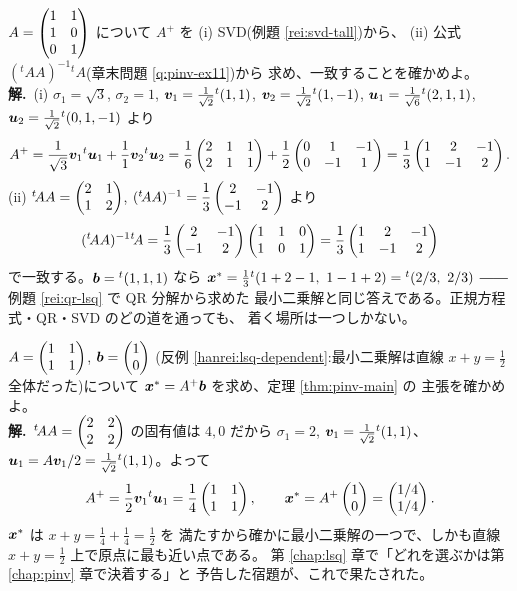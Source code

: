 \begin{rei}\label{rei:pinv-fullcol}
$A = \begin{pmatrix}1 & 1 \\ 1 & 0 \\ 0 & 1\end{pmatrix}$ について $A^{+}$ を
(i) SVD(例題 \ref{rei:svd-tall})から、
(ii) 公式 $({}^t\!AA)^{-1}{}^t\!A$(章末問題 \ref{q:pinv-ex11})から
求め、一致することを確かめよ。\\
\textbf{解.}\ (i) $\sigma_1 = \sqrt{3}$, $\sigma_2 = 1$,
$\bm{v}_1 = \frac{1}{\sqrt{2}}{}^t(1,1)$,
$\bm{v}_2 = \frac{1}{\sqrt{2}}{}^t(1,-1)$,
$\bm{u}_1 = \frac{1}{\sqrt{6}}{}^t(2,1,1)$,
$\bm{u}_2 = \frac{1}{\sqrt{2}}{}^t(0,1,-1)$ より
\[
A^{+} = \frac{1}{\sqrt{3}}\bm{v}_1{}^t\bm{u}_1
+ \frac{1}{1}\bm{v}_2{}^t\bm{u}_2
= \frac{1}{6}\begin{pmatrix}2 & 1 & 1 \\ 2 & 1 & 1\end{pmatrix}
+ \frac{1}{2}\begin{pmatrix}0 & 1 & -1 \\ 0 & -1 & 1\end{pmatrix}
= \frac{1}{3}\begin{pmatrix}1 & 2 & -1 \\ 1 & -1 & 2\end{pmatrix}.
\]
(ii) ${}^t\!AA = \begin{pmatrix}2 & 1 \\ 1 & 2\end{pmatrix}$,
$({}^t\!AA)^{-1} = \dfrac{1}{3}\begin{pmatrix}2 & -1 \\ -1 & 2\end{pmatrix}$ より
\[
({}^t\!AA)^{-1}{}^t\!A = \frac{1}{3}\begin{pmatrix}2 & -1 \\ -1 & 2\end{pmatrix}
\begin{pmatrix}1 & 1 & 0 \\ 1 & 0 & 1\end{pmatrix} = \frac{1}{3}\begin{pmatrix}1 & 2 & -1 \\ 1 & -1 & 2\end{pmatrix}
\]
で一致する。$\bm{b} = {}^t(1,1,1)$ なら
$\bm{x}^* = \frac{1}{3}{}^t(1 + 2 - 1,\ 1 - 1 + 2)
= {}^t(2/3,\ 2/3)$ ――例題 \ref{rei:qr-lsq} で QR 分解から求めた
最小二乗解と同じ答えである。正規方程式・QR・SVD のどの道を通っても、
着く場所は一つしかない。
\end{rei}

\begin{rei}\label{rei:pinv-dependent2}
$A = \begin{pmatrix}1 & 1 \\ 1 & 1\end{pmatrix}$, $\bm{b} = \begin{pmatrix}1 \\ 0\end{pmatrix}$
(反例 \ref{hanrei:lsq-dependent}:最小二乗解は直線
$x + y = \frac{1}{2}$ 全体だった)について
$\bm{x}^* = A^{+}\bm{b}$ を求め、定理 \ref{thm:pinv-main} の
主張を確かめよ。\\
\textbf{解.}\ ${}^t\!AA = \begin{pmatrix}2 & 2 \\ 2 & 2\end{pmatrix}$ の固有値は $4, 0$ だから
$\sigma_1 = 2$, $\bm{v}_1 = \frac{1}{\sqrt{2}}{}^t(1,1)$、
$\bm{u}_1 = A\bm{v}_1/2 = \frac{1}{\sqrt{2}}{}^t(1,1)$。よって
\[
A^{+} = \frac{1}{2}\bm{v}_1{}^t\bm{u}_1
= \frac{1}{4}\begin{pmatrix}1 & 1 \\ 1 & 1\end{pmatrix}, \qquad
\bm{x}^* = A^{+}\begin{pmatrix}1 \\ 0\end{pmatrix} = \begin{pmatrix}1/4 \\ 1/4\end{pmatrix}.
\]
$\bm{x}^*$ は $x + y = \frac{1}{4} + \frac{1}{4} = \frac{1}{2}$ を
満たすから確かに最小二乗解の一つで、しかも直線
$x + y = \frac{1}{2}$ 上で原点に最も近い点である。
第 \ref{chap:lsq} 章で「どれを選ぶかは第 \ref{chap:pinv} 章で決着する」と
予告した宿題が、これで果たされた。
\end{rei}

